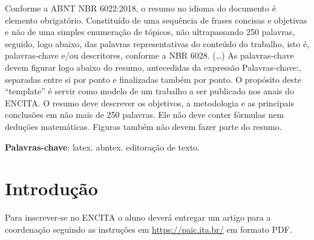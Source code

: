 \documentclass[
	article,			%
	10pt,				%
	oneside,			%
	a4paper,			%
  twocolumn,			%
	english,			%
	brazil,				%
	sumario=tradicional,
	]{abntex2}
\begin{document}

\frenchspacing


\maketitle

\begin{resumoumacoluna}
 Conforme a ABNT NBR 6022:2018, o resumo no idioma do documento é elemento obrigatório.
 Constituído de uma sequência de frases concisas e objetivas e não de uma
 simples enumeração de tópicos, não ultrapassando 250 palavras, seguido, logo
 abaixo, das palavras representativas do conteúdo do trabalho, isto é,
 palavras-chave e/ou descritores, conforme a NBR 6028. (\ldots) As
 palavras-chave devem figurar logo abaixo do resumo, antecedidas da expressão
 Palavras-chave:, separadas entre si por ponto e finalizadas também por ponto.
 O propósito deste ``template'' é servir como modelo de um trabalho a ser publicado nos
 anais do ENCITA. O resumo deve descrever os objetivos, a metodologia e as principais
 conclusões em não mais de 250 palavras. Ele não deve conter fórmulas nem deduções
 matemáticas. Figuras também não devem fazer parte do resumo.
 \vspace{\onelineskip}

 \noindent
 \textbf{Palavras-chave}: latex. abntex. editoração de texto.
\end{resumoumacoluna}

\textual

\section{Introdução}

Para inscrever-se no ENCITA o aluno deverá entregar um artigo para a coordenação
seguindo as instruções em \url{https://paic.ita.br/} em formato PDF.
\end{document}
